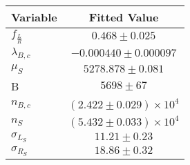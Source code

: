 \begin{tabular}[t]{lc}
\hline
Variable &Fitted Value\\
\hline\hline
$f_{\frac{L}{R}}$&$0.468\pm0.025$\\
\hline
$\lambda_{B,c}$&$-0.000440\pm0.000097$\\
\hline
$\mu_S$&$5278.878\pm0.081$\\
\hline
B&$5698\pm67$\\
\hline
$n_{B,c}$&$(2.422\pm0.029)\times 10^4$\\
\hline
$n_S$&$(5.432\pm0.033)\times 10^4$\\
\hline
$\sigma_{L_S}$&$11.21\pm0.23$\\
\hline
$\sigma_{R_S}$&$18.86\pm0.32$\\
\hline
\end{tabular}